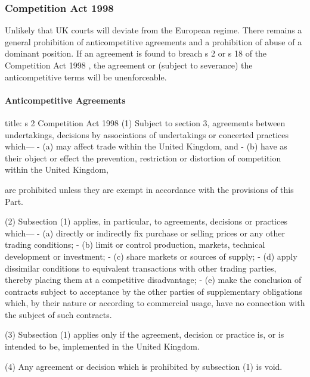 \documentclass[
]{article}
\newenvironment{Shaded}{}{}
\newcommand{\NormalTok}[1]{#1}
\begin{document}
\hypertarget{competition-act-1998}{%
\subsubsection{Competition Act 1998}\label{competition-act-1998}}

Unlikely that UK courts will deviate from the European regime. There
remains a general prohibition of anticompetitive agreements and a
prohibition of abuse of a dominant position. If an agreement is found to
breach s 2 or s 18 of the Competition Act 1998 , the agreement or
(subject to severance) the anticompetitive terms will be unenforceable.

\hypertarget{anticompetitive-agreements}{%
\paragraph{Anticompetitive
Agreements}\label{anticompetitive-agreements}}

\begin{Shaded}
\begin{Highlighting}[]
\NormalTok{title: s 2 Competition Act 1998}
\NormalTok{(1) Subject to section 3, agreements between undertakings, decisions by associations of undertakings or concerted practices which—}
\NormalTok{{-} (a) may affect trade within the United Kingdom, and}
\NormalTok{{-} (b) have as their object or effect the prevention, restriction or distortion of competition within the United Kingdom,}

\NormalTok{are prohibited unless they are exempt in accordance with the provisions of this Part.}

\NormalTok{(2) Subsection (1) applies, in particular, to agreements, decisions or practices which—}
\NormalTok{{-} (a) directly or indirectly fix purchase or selling prices or any other trading conditions;}
\NormalTok{{-} (b) limit or control production, markets, technical development or investment;}
\NormalTok{{-} (c) share markets or sources of supply;}
\NormalTok{{-} (d) apply dissimilar conditions to equivalent transactions with other trading parties, thereby placing them at a competitive disadvantage;}
\NormalTok{{-} (e) make the conclusion of contracts subject to acceptance by the other parties of supplementary obligations which, by their nature or according to commercial usage, have no connection with the subject of such contracts.}

\NormalTok{(3) Subsection (1) applies only if the agreement, decision or practice is, or is intended to be, implemented in the United Kingdom.}

\NormalTok{(4) Any agreement or decision which is prohibited by subsection (1) is void.}
\end{Highlighting}
\end{Shaded}
\end{document}
